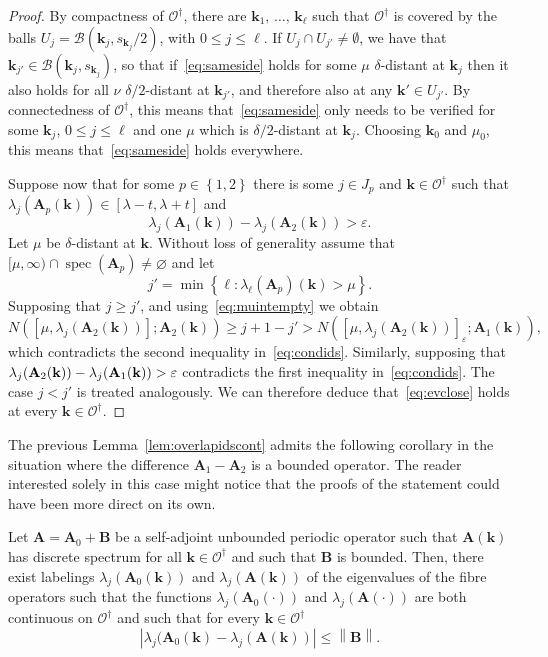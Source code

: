 \documentclass[10pt]{amsart}
\theoremstyle{definition}\newtheorem{defi}[theo]{Definition}\newtheorem{rema}[theo]{Remark}\newtheorem{exam}[theo]{Example}\newtheorem{nota}[theo]{Notation}
\DeclareMathOperator{\spec}{spec}
\newcommand{\CB}{\mathcal{B}}
\newcommand{\CO}{\mathcal{O}}
\newcommand{\BA}{\mathbf A}
\newcommand{\BB}{\mathbf B}
\newcommand{\bk}{\mathbf k}
\newcommand{\eps}{\varepsilon}
\newcommand{\set}[1]{\left\{ #1 \right\}}
\newcommand{\norm}[1]{\left\| #1 \right\|}
\begin{document}
\begin{proof}
By compactness of $\CO^\dagger$, there are $\bk_1,\,\dotsc,\,\bk_\ell$ such that $\CO^\dagger$ is covered by the balls $U_j = \CB(\bk_j,s_{\bk_j}/2)$, with $0 \le j \le \ell$. If $U_{j} \cap U_{j'} \ne
\emptyset$, we have that $\bk_{j'} \in \CB(\bk_j,s_{\bk_j})$, so that if~\eqref{eq:sameside} holds for some $\mu$ $\delta$-distant at $\bk_j$ then it also holds for all $\nu$ $\delta/2$-distant at $\bk_{j'}$, and therefore also at any $\bk' \in U_{j'}$. By connectedness of $\CO^\dagger$, this means that~\eqref{eq:sameside} only needs to be verified for some $\bk_j$, $0 \le j \le \ell$ and one $\mu$ which is $\delta/2$-distant at $\bk_j$. Choosing $\bk_0$ and $\mu_0$, this means that~\eqref{eq:sameside} holds everywhere.



Suppose now that for some $p \in \set{1,2}$ there is some $j \in J_p$ and $\bk \in \CO^\dagger$ such that $\lambda_j(\BA_p(\bk)) \in [\lambda-t,\lambda+t]$ and
\begin{equation}
\lambda_j(\BA_1(\bk)) - \lambda_j(\BA_2(\bk)) > \eps.
\end{equation}
Let $\mu$ be $\delta$-distant at $\bk$. Without loss of generality assume that $[\mu,\infty) \cap \spec(\BA_p) \ne \varnothing$ and let
\begin{equation}
j' = \min \set{\ell : \lambda_\ell(\BA_p)(\bk) > \mu}.
\end{equation}
Supposing that $j \ge j'$, and using~\eqref{eq:muintempty} we obtain
\begin{equation}
N\left(\left[\mu,\lambda_j(\BA_2(\bk))\right];\BA_2(\bk)\right) \ge j + 1 - j' > N\left(\left[\mu,\lambda_j(\BA_2(\bk))\right]_{\eps};\BA_1(\bk)\right),
\end{equation}
which contradicts the second inequality in~\eqref{eq:condids}. Similarly, supposing that $\lambda_j(\BA_2(\bk))\linebreak - \lambda_j(\BA_1(\bk)) > \eps$ contradicts the first inequality in~\eqref{eq:condids}. The case $j < j'$ is treated analogously. We can therefore deduce that~\eqref{eq:evclose} holds at every $\bk \in \CO^\dagger$.
\end{proof}


The previous Lemma~\ref{lem:overlapidscont} admits the following corollary in the situation where the difference $\BA_1 - \BA_2$ is a bounded operator. The reader interested solely in this case might notice that the proofs of the statement could have been more direct on its own.

\begin{coro}
Let $\BA = \BA_0 + \BB$ be a self-adjoint unbounded periodic operator such that $\BA(\bk)$ has discrete spectrum for all $\bk \in \CO^\dagger$ and such that $\BB$ is bounded. Then, there exist labelings $\lambda_j(\BA_0(\bk))$ and $\lambda_j(\BA(\bk))$ of the eigenvalues of the fibre operators such that the functions $\lambda_j(\BA_0(\cdot))$ and $\lambda_j(\BA(\cdot))$ are both continuous on $\CO^\dagger$ and such that for every $\bk \in \CO^\dagger$
\begin{equation}
\left|\lambda_j(\BA_0(\bk) - \lambda_j(\BA(\bk))\right| \le \norm{\BB}.
\end{equation}
\end{coro}
\end{document}
